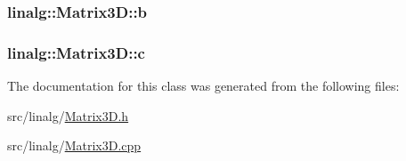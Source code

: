 \subsubsection[{\texorpdfstring{b}{b}}]{ linalg\+::\+Matrix3\+D\+::b\hspace{0.3cm}{\ttfamily [private]}}\hypertarget{classlinalg_1_1Matrix3D_acf0cd214420329fe18c902be95da0b23}{}\label{classlinalg_1_1Matrix3D_acf0cd214420329fe18c902be95da0b23}
\subsubsection[{\texorpdfstring{c}{c}}]{ linalg\+::\+Matrix3\+D\+::c\hspace{0.3cm}{\ttfamily [private]}}\hypertarget{classlinalg_1_1Matrix3D_abe82e945bf73f0d0f6f28c1749e2c7e3}{}\label{classlinalg_1_1Matrix3D_abe82e945bf73f0d0f6f28c1749e2c7e3}


The documentation for this class was generated from the following files\+:\begin{DoxyCompactItemize}
\item 
src/linalg/\hyperlink{Matrix3D_8h}{Matrix3\+D.\+h}\item 
src/linalg/\hyperlink{Matrix3D_8cpp}{Matrix3\+D.\+cpp}\end{DoxyCompactItemize}
